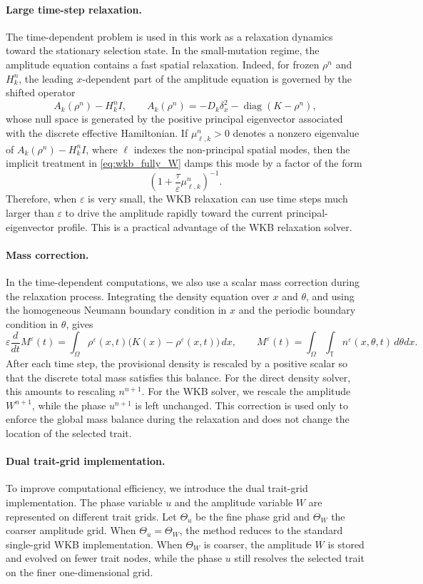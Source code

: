 \documentclass[11pt]{article}
\begin{document}
\paragraph{Large time-step relaxation.}
The time-dependent problem is used in this work as a relaxation dynamics
toward the stationary selection state. In the small-mutation regime, the
amplitude equation contains a fast spatial relaxation. Indeed, for frozen
$\rho^n$ and $H_k^n$, the leading $x$-dependent part of the amplitude equation
is governed by the shifted operator
$$
A_k(\rho^n)-H_k^n I,
\qquad
A_k(\rho^n)=-D_k\delta_x^2-\operatorname{diag}(K-\rho^n),
$$
whose null space is generated by the positive principal eigenvector associated
with the discrete effective Hamiltonian. If
$\mu_{\ell,k}^n>0$ denotes a nonzero eigenvalue of
$A_k(\rho^n)-H_k^n I$, where $\ell$ indexes the non-principal spatial modes,
then the implicit treatment in \eqref{eq:wkb_fully_W} damps this mode by a
factor of the form
$$
\left(1+\frac{\tau}{\varepsilon}\mu_{\ell,k}^n\right)^{-1}.
$$
Therefore, when $\varepsilon$ is very small, the WKB relaxation can use time
steps much larger than $\varepsilon$ to drive the amplitude rapidly toward the
current principal-eigenvector profile. This is a practical advantage of the WKB
relaxation solver.



\paragraph{Mass correction.}
In the time-dependent computations, we also use a scalar mass correction
during the relaxation process. Integrating the density equation over
\(x\) and \(\theta\), and using the homogeneous Neumann boundary condition
in \(x\) and the periodic boundary condition in \(\theta\), gives
\[
\varepsilon \frac{d}{dt} M^\varepsilon(t)
=
\int_\Omega
\rho^\varepsilon(x,t)
\bigl(K(x)-\rho^\varepsilon(x,t)\bigr)\,dx,
\qquad
M^\varepsilon(t)
=
\int_\Omega\int_{\mathbb T}
n^\varepsilon(x,\theta,t)\,d\theta dx .
\]
After each time step, the provisional density is rescaled by a positive
scalar so that the discrete total mass satisfies this balance. For the
direct density solver, this amounts to rescaling \(n^{n+1}\). For the
WKB solver, we rescale the amplitude \(W^{n+1}\), while the phase
\(u^{n+1}\) is left unchanged. This correction is used only to enforce
the global mass balance during the relaxation and does not change the
location of the selected trait.


\paragraph{Dual trait-grid implementation.} To improve computational efficiency, we introduce the dual trait-grid
implementation.  The phase variable \(u\) and the amplitude variable \(W\) are
represented on different trait grids.  Let \(\Theta_u\) be the fine phase grid
and \(\Theta_W\) the coarser amplitude grid.  When
\(\Theta_u=\Theta_W\), the method reduces to the standard single-grid WKB
implementation.  When \(\Theta_W\) is coarser, the amplitude \(W\) is stored and
evolved on fewer trait nodes, while the phase \(u\) still resolves the selected
trait on the finer one-dimensional grid.
\end{document}
